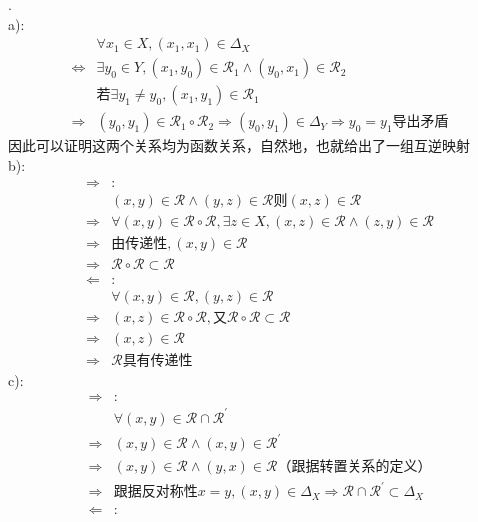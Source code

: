 \begin{solution}.\\
a):\\
\begin{align*}
    &\forall x_1\in X,(x_1,x_1)\in \Delta_X\\
    \Leftrightarrow&\exists y_0\in Y,(x_1,y_0)\in \mathcal{R}_1\land (y_0,x_1)\in \mathcal{R}_2\\
    &\text{若}\exists y_1\neq y_0,(x_1,y_1)\in \mathcal{R}_1\\
    \Rightarrow&(y_0,y_1)\in \mathcal{R}_1\circ\mathcal{R}_2\Rightarrow (y_0,y_1)\in \Delta_Y\Rightarrow y_0=y_1\text{导出矛盾}
\end{align*}
因此可以证明这两个关系均为函数关系，自然地，也就给出了一组互逆映射\\
b):\\
\begin{align*}
\Rightarrow&:\\
&(x,y)\in \mathcal{R}\land (y,z)\in \mathcal{R}\text{则}(x,z)\in \mathcal{R}\\
\Rightarrow&\forall (x,y)\in \mathcal{R}\circ\mathcal{R},\exists z\in X,(x,z)\in \mathcal{R}\land (z,y)\in \mathcal{R}\\
\Rightarrow&\text{由传递性}, (x,y)\in \mathcal{R}\\
\Rightarrow&\mathcal{R}\circ \mathcal{R}\subset \mathcal{R}\\
\Leftarrow&:\\
&\forall (x,y)\in \mathcal{R},(y,z)\in \mathcal{R}\\
\Rightarrow& (x,z)\in \mathcal{R}\circ\mathcal{R},\text{又}\mathcal{R}\circ\mathcal{R}\subset\mathcal{R}\\
\Rightarrow& (x,z)\in \mathcal{R}\\
\Rightarrow&\mathcal{R}\text{具有传递性}
\end{align*}
c):\\
\begin{align*}
\Rightarrow&:\\
&\forall (x,y)\in \mathcal{R}\cap \mathcal{R}^\prime\\
\Rightarrow&(x,y)\in \mathcal{R}\land (x,y)\in \mathcal{R}^\prime\\
\Rightarrow&(x,y)\in \mathcal{R}\land (y,x)\in \mathcal{R}\text{（跟据转置关系的定义）}\\
\Rightarrow&\text{跟据反对称性}x=y,(x,y)\in \Delta_X \Rightarrow \mathcal{R}\cap \mathcal{R}^\prime \subset \Delta_X\\
\Leftarrow&:\\

\end{align*}
\end{solution}
